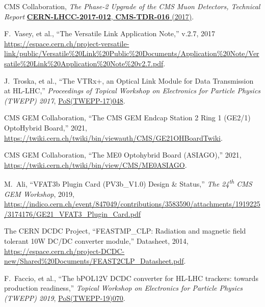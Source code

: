 \documentclass[a4paper,11pt]{article}
\begin{document}
\begin{thebibliography}{99}


 CMS Collaboration, \textit{The Phase-2 Upgrade of the CMS Muon Detectors, Technical Report} \href{https://cds.cern.ch/record/2283189}{\textbf{CERN-LHCC-2017-012}, \textbf{CMS-TDR-016} (2017)}. 

 F.~Vasey, et al., ``The Versatile Link Application Note,'' v.2.7, 2017 \url{https://espace.cern.ch/project-versatile-link/public/Versatile%20Link%20Public%20Documents/Application%20Note/Versatile%20Link%20Application%20Note%20v2.7.pdf}.

 J.~Troska, et al., ``The VTRx+, an Optical Link Module for Data Transmission at HL-LHC,'' \textit{Proceedings of Topical Workshop on Electronics for Particle Physics (TWEPP) 2017}, \href{https://pos.sissa.it/313/048/}{PoS(TWEPP-17)048}.

 CMS GEM Collaboration, ``The CMS GEM Endcap Station 2 Ring 1 (GE2/1) OptoHybrid Board,'' 2021, \url{https://twiki.cern.ch/twiki/bin/viewauth/CMS/GE21OHBoardTwiki}.

 CMS GEM Collaboration, ``The ME0 Optohybrid Board (ASIAGO),'' 2021, \url{https://twiki.cern.ch/twiki/bin/view/CMS/ME0ASIAGO}.

 M.~Ali, ``VFAT3b Plugin Card (PV3b\_V1.0) Design \& Status,'' \textit{The 24\textsuperscript{th} CMS GEM Workshop}, 2019, \url{https://indico.cern.ch/event/847049/contributions/3583590/attachments/1919225/3174176/GE21_VFAT3_Plugin_Card.pdf}

 The CERN DCDC Project, ``FEASTMP\_CLP: Radiation and magnetic field tolerant 10W DC/DC converter module,'' Datasheet, 2014, \url{https://espace.cern.ch/project-DCDC-new/Shared%20Documents/FEAST2CLP_Datasheet.pdf}.

 F.~Faccio, et al., ``The bPOL12V DCDC converter	
for	HL-LHC	trackers: towards production readiness,'' \textit{Topical Workshop on Electronics for Particle Physics (TWEPP) 2019}, \href{https://pos.sissa.it/370/070}{PoS(TWEPP-19)070}.


\end{thebibliography}

\end{document}
